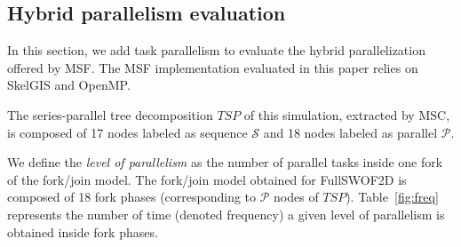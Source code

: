 %
%

\subsection{Hybrid parallelism evaluation}

In this section, we add task parallelism to evaluate the hybrid parallelization offered by MSF. The MSF implementation evaluated in this paper relies on SkelGIS and OpenMP.

The series-parallel tree decomposition $TSP$ of this simulation, extracted by MSC, is composed of 17 nodes labeled as sequence $\mathcal{S}$ and 18 nodes labeled as parallel $\mathcal{P}$. 

We define the \emph{level of parallelism} as the number of parallel tasks inside one fork of the fork/join model. The fork/join model obtained for FullSWOF2D is composed of 18 fork phases (corresponding to $\mathcal{P}$ nodes of $TSP$). Table~\ref{fig:freq} represents the number of time (denoted frequency) a given level of parallelism is obtained inside fork phases.

